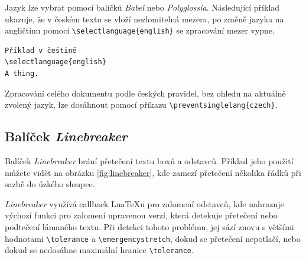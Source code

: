 \documentclass{csbulletin}
\newcommand\balicek[1]{\textit{#1}}
\begin{document}
Jazyk lze  vybrat pomocí balíčků \balicek{Babel} nebo \balicek{Polyglossia}. Následující příklad
ukazuje, že v českém textu se vloží nezlomitelná mezera, po změně jazyka na angličtinu pomocí
\verb|\selectlanguage{english}| se zpracování mezer vypne. 
  


\begin{verbatim}
Příklad v češtině
\selectlanguage{english}
A thing.
\end{verbatim}

\preventsingledebugon

\noindent {}

\preventsingledebugoff



\bigskip

Zpracování celého dokumentu podle českých pravidel, bez ohledu na aktuálně zvolený jazyk, lze dosáhnout pomocí příkazu 
\verb|\preventsinglelang{czech}|.

\subsection{Balíček \balicek{Linebreaker}}

\newcommand\testbox[1]{%
  \parbox{120pt}{%
    \parindent=15pt%
    \tolerance=1%
    \pretolerance=1%
    #1
  }%
}


\newcommand\printtest[1]{%
  \linebreakerdisable%
  \begin{subfigure}{.45\textwidth}
    \centering
  \caption{Bez Linebreakeru}
  \noindent\testbox{%
    #1
  }%
  \end{subfigure}
  \linebreakerenable%
  \hfill%
  \begin{subfigure}{.45\textwidth}
    \centering
  \caption{S Linebreakerem}
  \testbox{%
    #1
  }%
  \end{subfigure}
}

Balíček \balicek{Linebreaker} \cite{linebreaker} brání přetečení textu boxů a odstavců. 
Příklad jeho použití můžete vidět na obrázku \ref{fig:linebreaker}, kde zamezí přetečení 
několika řádků při sazbě do úzkého sloupce. 

\balicek{Linebreaker} využívá callback Lua\TeX u pro zalomení odstavců, kde nahrazuje výchozí 
funkci pro zalomení upravenou verzí, která detekuje přetečení nebo podtečení lámaného 
textu. Při detekci tohoto problému, jej sází znovu s většími hodnotami
\verb|\tolerance| a \verb|\emergencystretch|, dokud se přetečení nepotlačí, nebo dokud se nedosáhne 
maximální hranice \verb|\tolerance|.
\end{document}

